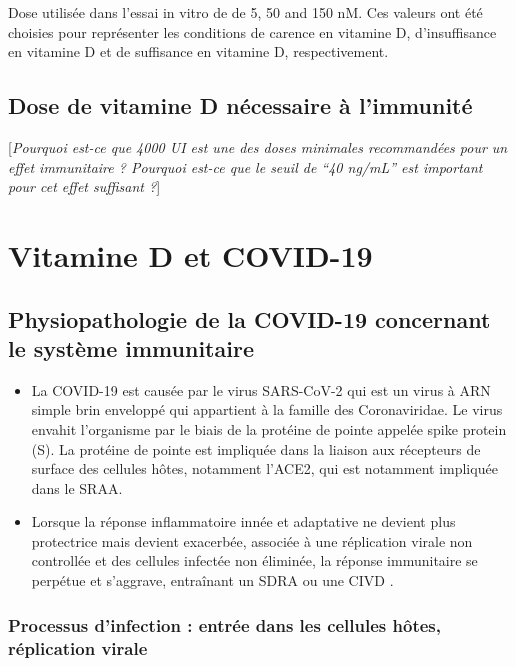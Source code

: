 \documentclass[
  a4paper,
  DIV=11,
  numbers=noendperiod,
  listof=totoc]{scrreprt}
\begin{document}
Dose utilisée dans l'essai in vitro de \textcite{Hewison.2007} de 5, 50
and 150 nM. Ces valeurs ont été choisies pour représenter les conditions
de carence en vitamine D, d'insuffisance en vitamine D et de suffisance
en vitamine D, respectivement.

\section{Dose de vitamine D nécessaire à
l'immunité}\label{dose-de-vitamine-d-nuxe9cessaire-uxe0-limmunituxe9}

{[}\emph{Pourquoi est-ce que 4000 UI est une des doses minimales
recommandées pour un effet immunitaire ? Pourquoi est-ce que le seuil de
``40 ng/mL'' est important pour cet effet suffisant ?}{]}

\newpage{}

\chapter{Vitamine D et COVID-19}\label{vitamine-d-et-covid-19}

\section{Physiopathologie de la COVID-19 concernant le système
immunitaire}\label{physiopathologie-de-la-covid-19-concernant-le-systuxe8me-immunitaire}

\begin{itemize}
\item
  La \ac{COVID-19} est causée par le virus \ac{SARS-CoV-2} qui est un
  virus à ARN simple brin enveloppé qui appartient à la famille des
  Coronaviridae. Le virus envahit l'organisme par le biais de la
  protéine de pointe appelée spike protein (S). La protéine de pointe
  est impliquée dans la liaison aux récepteurs de surface des cellules
  hôtes, notamment l'\ac{ACE2}, qui est notamment impliquée dans le
  \ac{SRAA}.
\item
  Lorsque la réponse inflammatoire innée et adaptative ne devient plus
  protectrice mais devient exacerbée, associée à une réplication virale
  non controllée et des cellules infectée non éliminée, la réponse
  immunitaire se perpétue et s'aggrave, entraînant un \ac{SDRA} ou une
  \ac{CIVD} \autocite{Contreras-Bolívar.2023}.
\end{itemize}

\subsection{Processus d'infection : entrée dans les cellules hôtes,
réplication
virale}\label{processus-dinfection-entruxe9e-dans-les-cellules-huxf4tes-ruxe9plication-virale}
\end{document}
